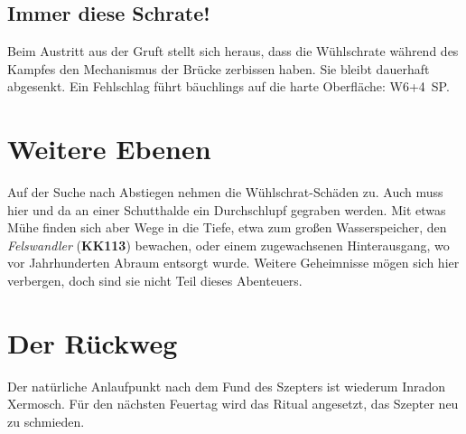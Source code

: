 \documentclass[openright]{Ilaris}
\begin{document}
\subsection{Immer diese Schrate!}
Beim Austritt aus der Gruft stellt sich heraus, dass die Wühlschrate während des Kampfes den Mechanismus der Brücke zerbissen haben. Sie bleibt dauerhaft abgesenkt.
Ein Fehlschlag führt bäuchlings auf die harte Oberfläche: W6+4~SP.
\section{Weitere Ebenen}
Auf der Suche nach Abstiegen nehmen die Wühlschrat-Schäden zu. Auch muss hier und da an einer Schutthalde ein Durchschlupf gegraben werden.
Mit etwas Mühe finden sich aber Wege in die Tiefe, etwa zum großen Wasserspeicher, den \emph{Felswandler} (\textbf{KK113}) bewachen, oder einem zugewachsenen Hinterausgang, wo vor Jahrhunderten Abraum entsorgt wurde.
Weitere Geheimnisse mögen sich hier verbergen, doch sind sie nicht Teil dieses Abenteuers.

\spaltenende

\spaltenanfang
\section{Der Rückweg}
\label{zuruck}


Der natürliche Anlaufpunkt nach dem Fund des Szepters ist wiederum Inradon Xermosch.
Für den nächsten Feuertag wird das Ritual angesetzt, das Szepter neu zu schmieden.
\end{document}
